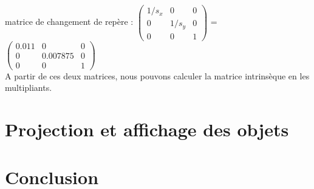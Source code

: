 \documentclass[a4paper,11pt]{article}
\begin{document}
  matrice de changement de repère : 
   $\begin{pmatrix}
     1/s_x & 0 & 0\\  
     0 & 1/s_y & 0\\  
     0 & 0 & 1 
     \end{pmatrix}$ = 
   $\begin{pmatrix}
     0.011 & 0 & 0\\  
     0 & 0.007875 & 0\\  
     0 & 0 & 1 
     \end{pmatrix}$\\
     
  A partir de ces deux matrices, nous pouvons calculer la matrice intrinsèque en les multipliants. 
     
  \section{Projection et affichage des objets}
  
  
  \section*{Conclusion}
  
    
\end{document}

